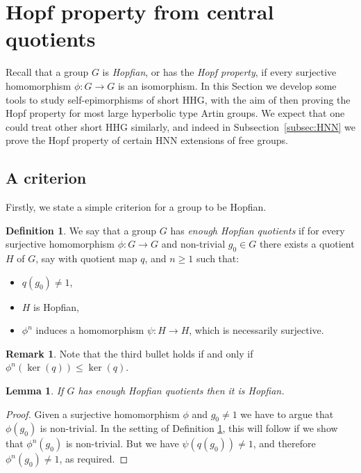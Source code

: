 \documentclass[svgnames]{amsart}
\theoremstyle{plain}
\newtheorem{lemma}[thm]{Lemma}
\theoremstyle{definition}
\newtheorem{defn}[thm]{Definition}
\newtheorem{rem}[thm]{Remark}
\begin{document}
\section{Hopf property from central quotients}\label{sec:hopf}
Recall that a group $G$ is \emph{Hopfian}, or has the \emph{Hopf property}, if every surjective homomorphism $\phi\colon G\to G$ is an isomorphism. In this Section we develop some tools to study self-epimorphisms of short HHG, with the aim of then proving the Hopf property for most large hyperbolic type Artin groups. We expect that one could treat other short HHG similarly, and indeed in Subsection~\ref{subsec:HNN} we prove the Hopf property of certain HNN extensions of free groups.

\subsection{A criterion}
Firstly, we state a simple criterion for a group to be Hopfian.

\begin{defn}
\label{defn:enough}
    We say that a group $G$ has \emph{enough Hopfian quotients} if for every surjective homomorphism $\phi: G\to G$ and non-trivial $g_0\in G$ there exists a quotient $H$ of $G$, say with quotient map $q$, and $n\geq 1$ such that:
\begin{itemize}
 \item $q(g_0)\neq 1$,
 \item $H$ is Hopfian,
 \item $\phi^n$ induces a homomorphism $\psi:H\to H$, which is necessarily surjective.
\end{itemize}
\end{defn}

\begin{rem}
    Note that the third bullet holds if and only if $\phi^n(\ker(q))\le\ker(q)$.
\end{rem}



\begin{lemma}
\label{lem:enough}
    If $G$ has enough Hopfian quotients then it is Hopfian.
\end{lemma}

\begin{proof}
    Given a surjective homomorphism $\phi$ and $g_0\neq 1$ we have to argue that $\phi(g_0)$ is non-trivial. In the setting of Definition \ref{defn:enough}, this will follow if we show that $\phi^n(g_0)$ is non-trivial. But we have $\psi(q(g_0))\neq 1$, and therefore $\phi^n(g_0)\neq 1$, as required. 
\end{proof}
\end{document}
